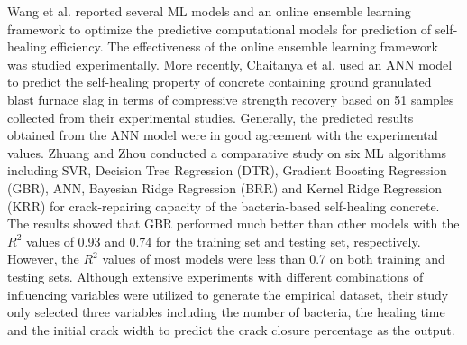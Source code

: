 \documentclass[11pt]{article}
\begin{document}
		
		
	
	Wang et al. \cite{wang2019towards} reported several ML models and an online ensemble learning framework to optimize the predictive computational models for prediction of self-healing efficiency. The effectiveness of the online ensemble learning framework was studied experimentally. More recently, Chaitanya et al. \cite{chaitanya2020prediction} used an ANN model to predict the self-healing property of concrete containing ground granulated blast furnace slag in terms of compressive strength recovery based on 51 samples collected from their experimental studies. Generally, the  predicted  results  obtained  from  the  ANN model  were  in good agreement with the experimental values. Zhuang and Zhou \cite{zhuang2019prediction} conducted a comparative study on six ML algorithms including SVR, Decision Tree Regression (DTR), Gradient Boosting Regression (GBR), ANN, Bayesian Ridge Regression (BRR) and Kernel Ridge Regression (KRR) for crack-repairing capacity of the bacteria-based self-healing concrete. The results showed that GBR performed much better than other models with the $R^2$ values of 0.93 and 0.74 for the training set and testing set, respectively. However, the $R^2$ values of most models were less than 0.7 on both training and testing sets. Although extensive experiments with different combinations of influencing variables were utilized to generate the empirical dataset, their study only selected three variables including the number of bacteria, the healing time and the initial crack width to predict the crack closure percentage as the output.
	
\end{document}
